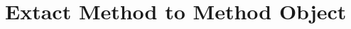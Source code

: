 \documentclass[11pt,a4paper,twoside]{tesis}
\begin{document}

\chapter{Extact Method to Method Object}






\backmatter
%
\end{document}
